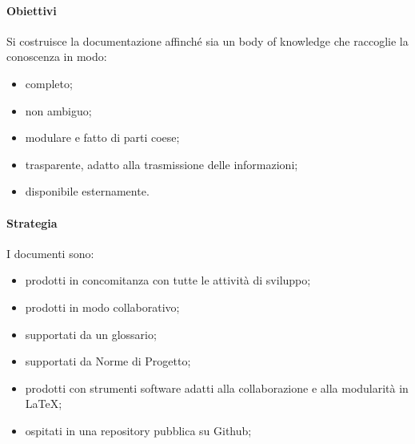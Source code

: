 		\paragraph{Obiettivi}
			Si costruisce la documentazione affinché sia un body of knowledge %
			che raccoglie la conoscenza in modo:
			\begin{itemize}
				\item completo;
				\item non ambiguo;
				\item modulare e fatto di parti coese;
				\item trasparente, adatto alla trasmissione delle informazioni;
				\item disponibile esternamente.
			\end{itemize}
		\paragraph{Strategia}
		I documenti sono:
		\begin{itemize}
			\item prodotti in concomitanza con tutte le attività di sviluppo;
			\item prodotti in modo collaborativo;
			\item supportati da un glossario;
			\item supportati da Norme di Progetto;
			\item prodotti con strumenti software adatti alla collaborazione e alla modularità in \LaTeX{};
			\item ospitati in una repository pubblica su Github;
		\end{itemize}
